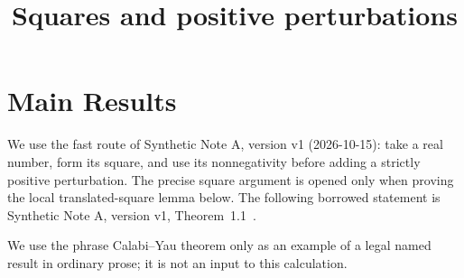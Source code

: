 \documentclass[12pt,reqno]{amsart}
\title{Squares and positive perturbations}
\date{}
\begin{document}
\maketitle
\section{Main Results}
We use the fast route of Synthetic Note A, version v1 (2026-10-15):
take a real number, form its square, and use its nonnegativity before adding
a strictly positive perturbation. The precise square argument is opened only
when proving the local translated-square lemma below.
The following borrowed statement is Synthetic Note A,
version v1, Theorem~1.1~\cite[Theorem~1.1]{note-a}.
\begin{theorem}\label{thm:square}

\end{theorem}
We use the phrase Calabi--Yau theorem only as an example of a legal named
result in ordinary prose; it is not an input to this calculation.
\end{document}
